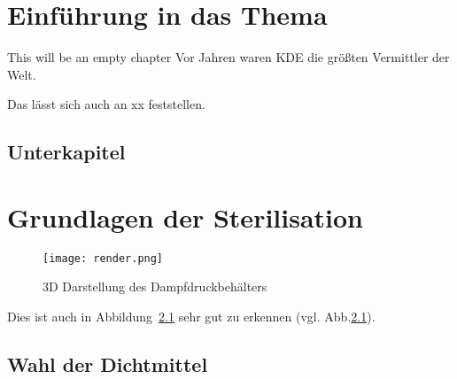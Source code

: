 



\chapter{Einführung in das Thema}           %



This will be an empty chapter
Vor Jahren waren \ac{KDE} die größten Vermittler der Welt.\par %

Das lässt sich auch an xx feststellen.\blindtext \par %

\blindtext{}

\section{Unterkapitel}
\blindtext{}



\chapter{Grundlagen der Sterilisation}
\blindtext[1] \par

\begin{figure}[htb]
    \centering  
    \texttt{[image: render.png]}
    \caption{3D Darstellung des Dampfdruckbehälters}\label{fig:render}
\end{figure}

\par

Dies ist auch in Abbildung~\ref{fig:render} sehr gut zu erkennen (vgl. Abb.\ref{fig:render}).


\blindtext[2] \par


\section{Wahl der Dichtmittel}
\blindtext[2] \par

